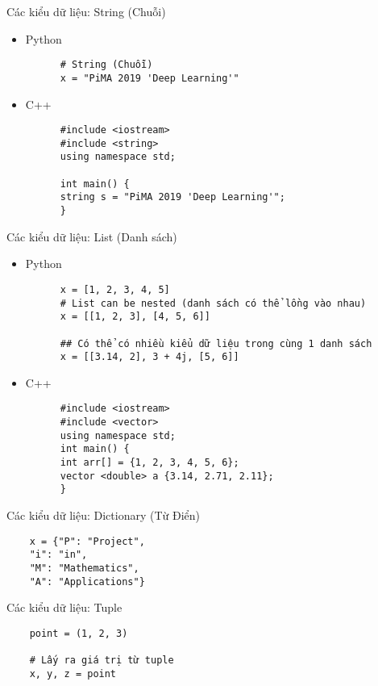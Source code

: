 \documentclass[10pt]{beamer}
\begin{document}
\begin{frame}[fragile]{Các kiểu dữ liệu: String (Chuỗi)}
  \begin{itemize}
    \item Python
    \begin{verbatim}
      # String (Chuỗi)
      x = "PiMA 2019 'Deep Learning'"
    \end{verbatim}

    \item C++
    \begin{verbatim}
      #include <iostream>
      #include <string>
      using namespace std;

      int main() {
      string s = "PiMA 2019 'Deep Learning'";
      }
    \end{verbatim}
  \end{itemize}

\end{frame}


\begin{frame}[fragile]{Các kiểu dữ liệu: List (Danh sách)}
  \begin{itemize}
    \item Python
    \begin{verbatim}
      x = [1, 2, 3, 4, 5]
      # List can be nested (danh sách có thể lồng vào nhau)
      x = [[1, 2, 3], [4, 5, 6]]

      ## Có thể có nhiều kiểu dữ liệu trong cùng 1 danh sách
      x = [[3.14, 2], 3 + 4j, [5, 6]]
    \end{verbatim}
    \item C++
    \begin{verbatim}
      #include <iostream>
      #include <vector>
      using namespace std;
      int main() {
      int arr[] = {1, 2, 3, 4, 5, 6};
      vector <double> a {3.14, 2.71, 2.11};
      }
    \end{verbatim}
  \end{itemize}
\end{frame}

\begin{frame}[fragile]{Các kiểu dữ liệu: Dictionary (Từ Điển)}
  \begin{verbatim}
    x = {"P": "Project",
    "i": "in",
    "M": "Mathematics",
    "A": "Applications"}
  \end{verbatim}
\end{frame}

\begin{frame}[fragile]{Các kiểu dữ liệu: Tuple}
  \begin{verbatim}
    point = (1, 2, 3)

    # Lấy ra giá trị từ tuple
    x, y, z = point
  \end{verbatim}


\end{frame}
\end{document}
